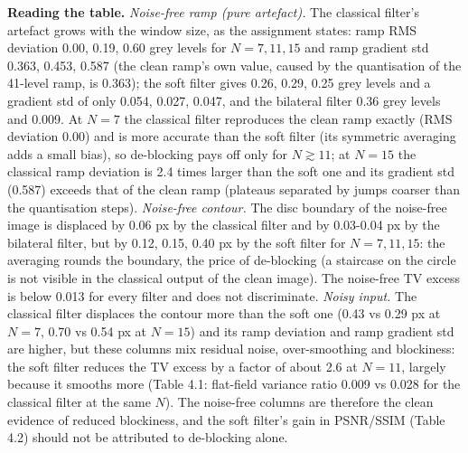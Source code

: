 \documentclass[10pt,a4paper]{article}
\begin{document}
\textbf{Reading the table.} \textit{Noise-free ramp (pure artefact).} The classical filter's artefact grows with the window size, as the assignment states: ramp RMS deviation 0.00, 0.19, 0.60 grey levels for $N=7,11,15$ and ramp gradient std 0.363, 0.453, 0.587 (the clean ramp's own value, caused by the quantisation of the 41-level ramp, is 0.363); the soft filter gives 0.26, 0.29, 0.25 grey levels and a gradient std of only 0.054, 0.027, 0.047, and the bilateral filter 0.36 grey levels and 0.009. At $N=7$ the classical filter reproduces the clean ramp exactly (RMS deviation 0.00) and is more accurate than the soft filter (its symmetric averaging adds a small bias), so de-blocking pays off only for $N\gtrsim11$; at $N=15$ the classical ramp deviation is 2.4 times larger than the soft one and its gradient std (0.587) exceeds that of the clean ramp (plateaus separated by jumps coarser than the quantisation steps). \textit{Noise-free contour.} The disc boundary of the noise-free image is displaced by 0.06 px by the classical filter and by 0.03-0.04 px by the bilateral filter, but by 0.12, 0.15, 0.40 px by the soft filter for $N=7,11,15$: the averaging rounds the boundary, the price of de-blocking (a staircase on the circle is not visible in the classical output of the clean image). The noise-free TV excess is below 0.013 for every filter and does not discriminate. \textit{Noisy input.} The classical filter displaces the contour more than the soft one (0.43 vs 0.29 px at $N=7$, 0.70 vs 0.54 px at $N=15$) and its ramp deviation and ramp gradient std are higher, but these columns mix residual noise, over-smoothing and blockiness: the soft filter reduces the TV excess by a factor of about 2.6 at $N=11$, largely because it smooths more (Table 4.1: flat-field variance ratio 0.009 vs 0.028 for the classical filter at the same $N$). The noise-free columns are therefore the clean evidence of reduced blockiness, and the soft filter's gain in PSNR/SSIM (Table 4.2) should not be attributed to de-blocking alone.
\end{document}
